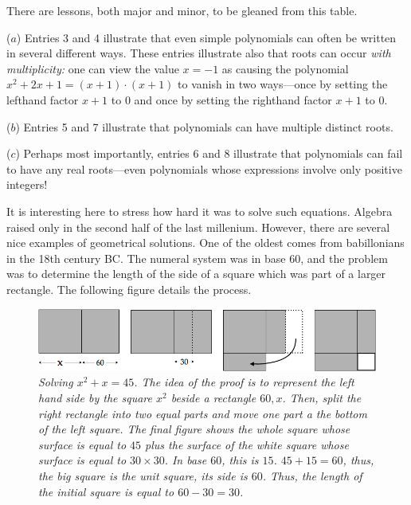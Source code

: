 \smallskip

\noindent
There are lessons, both major and minor, to be gleaned from this
table.

\noindent
($a$) Entries 3 and 4 illustrate that even simple polynomials can often be
written in several different ways.  These entries illustrate also that
roots can occur {\em with multiplicity:}
one can view the value $x = -1$ as causing the polynomial $x^2 + 2x +1
= (x+1)\cdot (x+1)$ to vanish in two ways---once by setting the
lefthand factor $x+1$ to $0$ and once by setting the righthand factor
$x+1$ to $0$.

\noindent
($b$) Entries 5 and 7 illustrate that polynomials can have multiple
distinct roots.

\noindent
($c$) Perhaps most importantly, entries 6 and 8 illustrate that
polynomials can fail to have any real roots---even polynomials whose
expressions involve only positive integers!
\medskip

{\Denis It is interesting here to stress how hard it was to solve such equations. Algebra raised only in the second half of the last millenium.
However, there are several nice examples of geometrical solutions.
One of the oldest comes from babillonians in the 18th century BC.
The numeral system was in base 60, and the problem was to determine the length of the side of a square which was part of a larger rectangle.
The following figure details the process.}
\begin{figure}[htb]
\begin{center}
       \includegraphics[scale=0.4]{FiguresArithmetic/tabletteMesopotamie}
\caption{{\it Solving $x^2 + x = 45$.
The idea of the proof is to represent the left hand side by the square $x^2$ beside a rectangle $60,x$.
Then, split the right rectangle into two equal parts and move one part a the bottom of the left square.
The final figure shows the whole square whose surface is equal to $45$ plus the surface of the white square
whose surface is equal to $30 \times 30$.
In base $60$, this is $15$. 
$45+15 = 60$, thus, the big square is the unit square, its side is $60$.
Thus, the length of the initial square is equal to $60-30=30$.}
\label{fig:equationBabillon}}
\end{center}
\end{figure}

